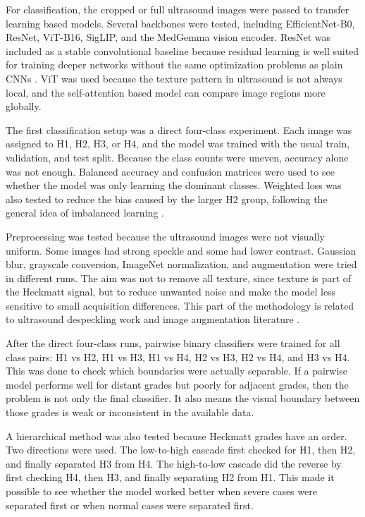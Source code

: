 \documentclass[twocolumn,10pt]{article}
\begin{document}
For classification, the cropped or full ultrasound images were passed to transfer learning based models. Several backbones were tested, including EfficientNet-B0, ResNet, ViT-B16, SigLIP, and the MedGemma vision encoder. ResNet was included as a stable convolutional baseline because residual learning is well suited for training deeper networks without the same optimization problems as plain CNNs \cite{he2016resnet}. ViT was used because the texture pattern in ultrasound is not always local, and the self-attention based model can compare image regions more globally.

The first classification setup was a direct four-class experiment. Each image was assigned to H1, H2, H3, or H4, and the model was trained with the usual train, validation, and test split. Because the class counts were uneven, accuracy alone was not enough. Balanced accuracy and confusion matrices were used to see whether the model was only learning the dominant classes. Weighted loss was also tested to reduce the bias caused by the larger H2 group, following the general idea of imbalanced learning \cite{HeGarcia2009,Cui2019}.

Preprocessing was tested because the ultrasound images were not visually uniform. Some images had strong speckle and some had lower contrast. Gaussian blur, grayscale conversion, ImageNet normalization, and augmentation were tried in different runs. The aim was not to remove all texture, since texture is part of the Heckmatt signal, but to reduce unwanted noise and make the model less sensitive to small acquisition differences. This part of the methodology is related to ultrasound despeckling work \cite{YuActon2002,Loizou2005} and image augmentation literature \cite{Shorten2019,Cubuk2019}.

After the direct four-class runs, pairwise binary classifiers were trained for all class pairs: H1 vs H2, H1 vs H3, H1 vs H4, H2 vs H3, H2 vs H4, and H3 vs H4. This was done to check which boundaries were actually separable. If a pairwise model performs well for distant grades but poorly for adjacent grades, then the problem is not only the final classifier. It also means the visual boundary between those grades is weak or inconsistent in the available data.

A hierarchical method was also tested because Heckmatt grades have an order. Two directions were used. The low-to-high cascade first checked for H1, then H2, and finally separated H3 from H4. The high-to-low cascade did the reverse by first checking H4, then H3, and finally separating H2 from H1. This made it possible to see whether the model worked better when severe cases were separated first or when normal cases were separated first.
\end{document}
